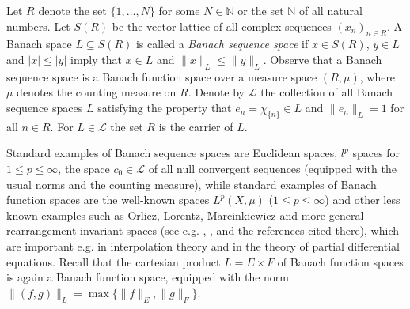 \documentclass[12pt, reqno]{amsart}
\theoremstyle{definition}
\theoremstyle{remark}
\numberwithin{equation}{section}
\newcommand{\NN}{\mathbb{N}}
\begin{document}
 Let $R$ denote the set $\{1, \ldots, N\}$ for some $N \in \NN$ or the set $\NN$ of all natural numbers.
Let $S(R)$ be the vector lattice of all complex sequences $(x_n)_{n\in R}$.
A Banach space $L \subseteq S(R)$ is called a {\it Banach sequence space} if $x \in S(R)$, $y \in L$
and $|x| \le |y|$ imply that $x \in L$ and $\|x\|_L \le \|y\|_L$. Observe that a Banach sequence space is a Banach function space over a measure space $(R, \mu)$,
where $\mu$ denotes the counting measure on $R$. Denote by $\mathcal{L}$ the collection of all Banach sequence spaces
$L$ satisfying the property that $e_n = \chi_{\{n\}} \in L$ and
$\|e_n\|_L=1$ for all $n \in R$. For $L\in \mathcal{L}$ the set $R$ is the carrier of $L$.









Standard examples of Banach sequence spaces are Euclidean spaces, $l^p$ spaces for $1\le p \le \infty$,  the space $c_0\in \mathcal{L}$
of all null convergent sequences  (equipped with the usual norms and the counting measure), while standard examples of Banach function spaces are  the well-known spaces $L^p (X,\mu)$ ($1\le p \le \infty$) and other less known examples such as Orlicz, Lorentz,  Marcinkiewicz  and more general  rearrangement-invariant spaces (see e.g. \cite{BS88}, \cite{CR07}, \cite{KM99} and the references cited there), which are important e.g. in interpolation theory and in the theory of partial differential equations.
 Recall that the cartesian product $L=E\times F$
of Banach function spaces is again a Banach function space, equipped with the norm
$\|(f, g)\|_L=\max \{\|f\|_E, \|g\|_F\}$.
\end{document}
